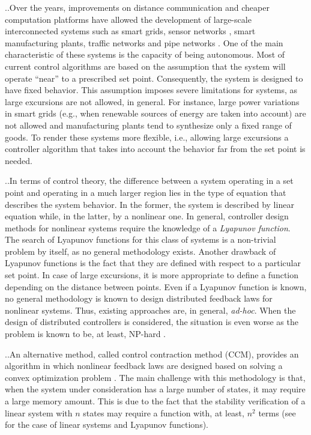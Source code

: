 \documentclass[10pt,twocolumn,twoside]{IEEEtran}
\newcounter{para}
\newcommand\mypara{\par \thesection.\refstepcounter{para}\thepara.\space}
\theoremstyle{plain}
\theoremstyle{definition}
\theoremstyle{remark}
\begin{document}
\mypara Over the years, improvements on distance communication and cheaper computation platforms have allowed the development of large-scale interconnected systems such as smart grids, sensor networks \cite{Pajic2011}, smart manufacturing plants, traffic networks \cite{CanudasdeWitMorbidiLeonOjedaEtAl2015} and pipe networks \cite{Persis2011a}. One of the main characteristic of these systems is the capacity of being autonomous. Most of current control algorithms are based on the assumption that the system will operate ``near'' to a prescribed set point. Consequently, the system is designed to have fixed behavior. This assumption imposes severe limitations for systems, as large excursions are not allowed, in general. For instance, large power variations in smart grids (e.g., when renewable sources of energy are taken into account) are not allowed and manufacturing plants tend to synthesize only a fixed range of goods. To render these systems more flexible, i.e., allowing large excursions a controller algorithm that takes into account the behavior far from the set point is needed.

\mypara In terms of control theory, the difference between a system operating in a set point and operating in a much larger region lies in the type of equation that describes the system behavior. In the former, the system is described by linear equation while, in the latter, by a nonlinear one. In general, controller design methods for nonlinear systems require the knowledge of a \emph{Lyapunov function}. The search of Lyapunov functions for this class of systems is a non-trivial problem by itself, as no general methodology exists. Another drawback of Lyapunov functions is the fact that they are defined with respect to a particular set point. In case of large excursions, it is more appropriate to define a function depending on the distance between points. Even if a Lyapunov function is known, no general methodology is known to design distributed feedback laws for nonlinear systems. Thus, existing approaches are, in general, \emph{ad-hoc}. When the design of distributed controllers is considered, the situation is even worse as the problem is known to be, at least, NP-hard \cite{BlondelTsitsiklis1997,Tanaka2011}.

\mypara  An alternative method, called control contraction method (CCM), provides an algorithm in which nonlinear feedback laws are designed based on solving a convex optimization problem  \cite{Manchester2014a}. The main challenge with this methodology is that, when the system under consideration has a large number of states, it may require a large memory amount. This is due to the fact that the stability verification of a linear system with $n$ states may require a function with, at least, $n^2$ terms (see \cite{Rantzer2015} for the case of linear systems and Lyapunov functions).
\end{document}
